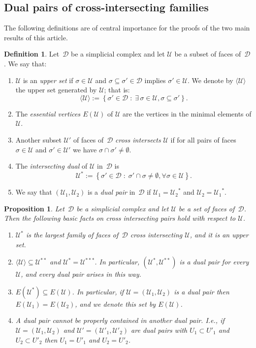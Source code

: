 \documentclass[a4paper,12pt]{amsart}
\theoremstyle{plain}
\newtheorem{proposition}[theorem]{Proposition}
\theoremstyle{definition}
\newtheorem{definition}[theorem]{Definition}
\newcommand{\darkred}{\color{darkred}} %
\newcommand{\U}{\mathcal U}
\newcommand{\D}{\mathcal D}
\newcommand{\face}{\sigma}
\newcommand{\defn}[1]{\emph{\darkred #1}} %
\newcommand{\set}[2]{\left\{ #1 \; : \; #2 \right\}}
\begin{document}
\subsection{Dual pairs of cross-intersecting families}

The following definitions are of central importance for the proofs of the two main results of this article.

\begin{definition}
\label{def:dp}
Let~$\D$ be a simplicial complex and let $\U$ be a subset of faces of~$\D$. We say that:
\begin{enumerate}

\item $\U$ is an  \defn{upper set} if $\face\in \U$ and $\face\subseteq \face'\in \D$ implies $\face'\in \U$. We denote by $\langle \U \rangle$ the upper set generated by $\U$; that is:
\[
\langle \U \rangle := \set{ \face'\in \D }{ \exists \, \face\in \U, \face\subseteq\face'}.
\]
\item The \defn{essential vertices $E(\U)$} of $\U$ are the vertices in the minimal elements of $\U$.
\item Another subset $\U'$ of faces of~$\D$ \defn{cross intersects} $\U$ if for all pairs of faces $\face\in \U$ and $\face'\in \U'$ we have $\face\cap \face'\ne\emptyset$.
\item The \defn{intersecting dual} of $\U$ in~$\D$ is
\[
\U^* :=\set{\face'\in \D }{ \face'\cap \face\ne \emptyset, \forall \face\in \U}.
\]
\item We  say that $(\U_1,\U_2)$ is a \defn{dual pair} in~$\D$ if $\U_1={\U_2}^*$ and $\U_2={\U_1}^*$.

\end{enumerate}
\end{definition}

\begin{proposition}
\label{prop:dual_pairs}
Let~$\D$ be a simplicial complex and let $\U$ be a set of faces of~$\D$. Then the following basic facts on cross intersecting pairs hold with respect to $\U$.

\begin{enumerate}
\item $\U^*$ is the largest family of faces of~$\D$ cross intersecting $\U$, and it is an upper set.
\label{prop:dual_pairs.1}
\item $\langle\U\rangle\subseteq \U^{**}$ and $\U^*= \U^{***}$. In particular, $(\U^*, \U^{**})$ is a dual pair for every $\U$, and every dual pair arises in this way.
\label{prop:dual_pairs.2}
\item $E(\U^*)\subseteq E(\U)$. In particular, if $\U=(\U_1,\U_2)$ is a dual pair then $E(\U_1)=E(\U_2)$, and we denote this set by $E(\U)$.
\label{prop:dual_pairs.3}
\item A dual pair cannot be properly contained in another dual pair. I.e., if $\U = (\U_1, \U_2)$ and $\U' = (\U'_1, \U'_2)$ are dual pairs with $U_1 \subset U'_1$ and $U_2 \subset U'_2$ then $U_1 = U'_1$ and $U_2 = U'_2$.
\label{prop:dual_pairs.4}
\end{enumerate}
\end{proposition}
\end{document}
